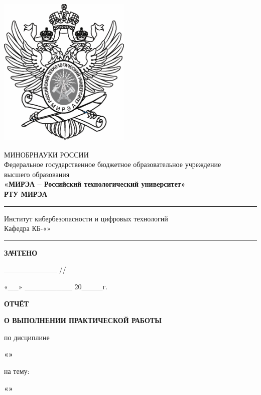 \fontsize{12}{12}\selectfont
\linespread{1}
\begin{center}
    \includegraphics[scale=0.5]{./title/title.png}
    
    МИНОБРНАУКИ РОССИИ\\
    Федеральное государственное бюджетное образовательное учреждение\\
    высшего образования\\
    \textbf{«МИРЭА -- Российский технологический университет»}\\
    \textbf{РТУ МИРЭА}\\
    \noindent\rule{\textwidth}{1pt}
    Институт кибербезопасности и цифровых технологий\\
    Кафедра КБ-\kafedranum «\kafedraname»\\ 
    \noindent\rule{\textwidth}{1pt}
    \end{center} 
    \vspace{12pt}
    
    \begin{flushright}
    \textbf {ЗАЧТЕНО}
    
    \_\_\_\_\_\_\_\_\_\_ /\prepodname /
    
    «\_\_» \_\_\_\_\_\_\_\_\_ 20\_\_\_\_г.
    
    \end{flushright}
    \linespread{1.5}
    \vspace{12pt}
    \fontsize{14}{14}\selectfont
    \begin {center}
    \textbf{ОТЧЁТ}
    
    \textbf{О ВЫПОЛНЕНИИ ПРАКТИЧЕСКОЙ РАБОТЫ}
    
    по дисциплине
    
    \textbf{«\discname»}
    
    на тему:
    
    \textbf{«\themename»}
    
    \end {center}


